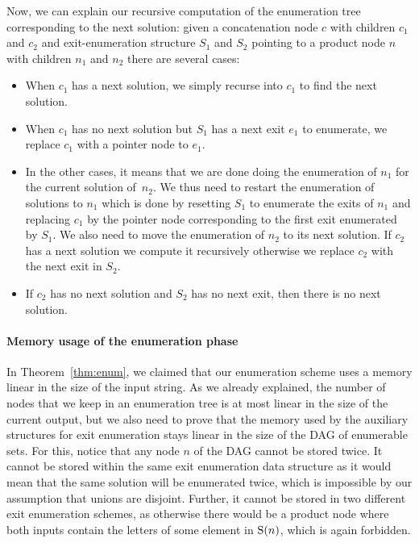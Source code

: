  Now, we can explain our recursive computation of the enumeration tree
 corresponding to the next solution: given a concatenation node $c$
 with children $c_1$ and $c_2$ and exit-enumeration structure $S_1$ and
 $S_2$ pointing to a product node $n$ with children $n_1$ and $n_2$
 there are several cases:
 \begin{itemize}
 \item When $c_1$ has a next solution, we simply recurse
       into $c_1$ to find the next solution.
 
 \item When $c_1$ has no next solution but $S_1$ has a next exit  $e_1$
       to enumerate, we replace $c_1$ with a pointer node to $e_1$.
 
 \item In the other cases, it means that we are done doing the enumeration
       of $n_1$ for the current solution of~$n_2$. We thus need to restart
       the enumeration of solutions to $n_1$ which is done by resetting
       $S_1$ to enumerate the exits of $n_1$ and replacing $c_1$ by the
       pointer node corresponding to the first exit enumerated
       by $S_1$.  We also need to move the enumeration of $n_2$ to its
       next solution. If $c_2$ has a next solution we compute it
       recursively otherwise we replace $c_2$ with the next exit in
       $S_2$.
  \item If $c_2$ has no next solution and $S_2$ has no next exit, then there is
    no next solution.
 \end{itemize}
 
 \paragraph{Memory usage of the enumeration phase}
 In Theorem~\ref{thm:enum}, we claimed that our enumeration scheme uses a memory
 linear in the size of the input string. As we already explained, the
 number of nodes that we keep in an enumeration tree is at most linear
 in the size of the current output, but we also need to prove that the
 memory used by the auxiliary structures for exit enumeration stays linear in the
 size of the DAG of enumerable sets. For this, notice that any node $n$
 of the DAG cannot be stored twice. It cannot be stored within the same
 exit enumeration data structure as it would mean that the same solution will
 be enumerated twice, which is impossible by our assumption that unions are
 disjoint. Further, it cannot be stored in two different
 exit enumeration schemes, as otherwise there would be a product node where both
 inputs contain the letters of some element in $\mathrm{S}(n)$, which is again
 forbidden.

